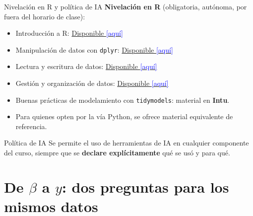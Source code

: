 \documentclass{beamer}
\newcommand{\1}{\mathbb{I}}
\begin{document}
\begin{frame}{Nivelación en R y política de IA}
\small
\textbf{Nivelación en R} (obligatoria, autónoma, por fuera del horario de clase):
\begin{itemize}\itemsep4pt
  \item Introducción a R:
  \href{https://eduard-martinez.github.io/blog/intro-R/index.html}{Disponible \textcolor{blue}{[aquí]}}
  \item Manipulación de datos con \texttt{dplyr}:
  \href{https://eduard-martinez.github.io/blog/dplyr/index.html}{Disponible \textcolor{blue}{[aquí]}}
  \item Lectura y escritura de datos:
  \href{https://eduard-martinez.github.io/blog/read_and_write_data/index.html}{Disponible \textcolor{blue}{[aquí]}}
  \item Gestión y organización de datos:
  \href{https://eduard-martinez.github.io/blog/data_managment/index.html}{Disponible \textcolor{blue}{[aquí]}}
  \item Buenas prácticas de modelamiento con \texttt{tidymodels}: material en \textbf{Intu}.
  \item Para quienes opten por la vía Python, se ofrece material equivalente de referencia.
\end{itemize}
\pause

\vspace{0.2cm}
\begin{block}{Política de IA}
Se permite el uso de herramientas de IA en cualquier componente del curso, siempre que se \textbf{declare explícitamente} qué se usó y para qué.
\end{block}
\end{frame}


\section{De $\beta$ a $y$: dos preguntas para los mismos datos}
\begin{frame}[noframenumbering]
\tableofcontents[currentsection]
\end{frame}
\end{document}
